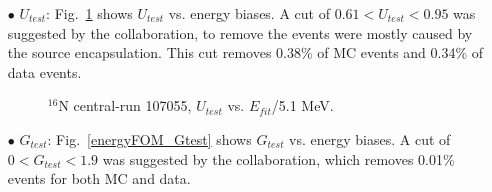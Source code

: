 \begin{itemize}
	\item[$\bullet$]$U_{test}$:
	Fig.~\ref{energyFOM_Utest} shows $U_{test}$ vs. energy biases. A cut of $0.61<U_{test}<0.95$ was suggested by the collaboration, to remove the events were mostly caused by the source encapsulation. This cut removes 0.38\% of MC events and 0.34\% of data events.
	\begin{figure}[!htb]
		\centering
		\caption{$^{16}$N central-run 107055, $U_{test}$ vs. $E_{fit}$/5.1 MeV.}
		\label{energyFOM_Utest}
	\end{figure}
	
	\item[$\bullet$] $G_{test}$: Fig.~\ref{energyFOM_Gtest} shows $G_{test}$ vs. energy biases. A cut of $0<G_{test}<1.9$ was suggested by the collaboration, which removes 0.01\% events for both MC and data.	
	

\end{itemize}
